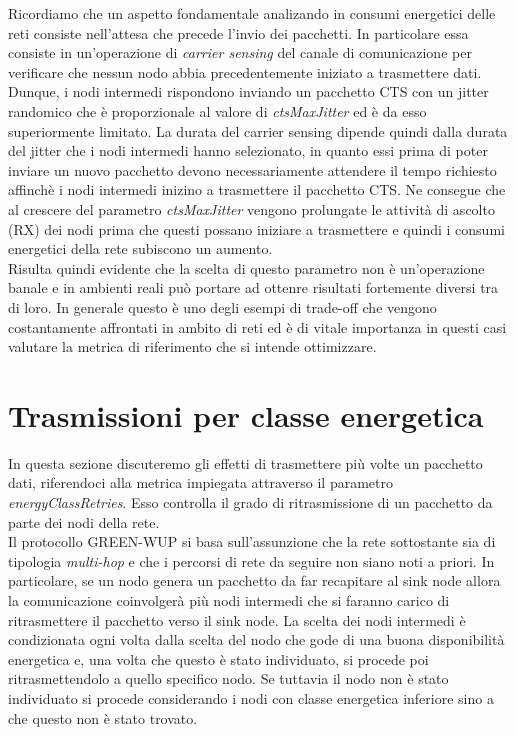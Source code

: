 \documentclass[binding=0.6cm,TFA]{sapthesis}
\begin{document}
Ricordiamo che un aspetto fondamentale analizando in consumi energetici delle reti consiste nell'attesa che precede l'invio dei pacchetti. In particolare essa
consiste in un'operazione di \emph{carrier sensing} del canale di comunicazione per verificare che nessun nodo abbia precedentemente iniziato a trasmettere dati.
Dunque, i nodi intermedi rispondono inviando un pacchetto CTS con un jitter randomico che è proporzionale al valore di \emph{ctsMaxJitter} ed è da esso superiormente
limitato. La durata del carrier sensing dipende quindi dalla durata del jitter che i nodi intermedi hanno selezionato, in quanto essi prima di poter inviare un nuovo
pacchetto devono necessariamente attendere il tempo richiesto affinchè i nodi intermedi inizino a trasmettere il pacchetto CTS. Ne consegue che al crescere del
parametro \emph{ctsMaxJitter} vengono prolungate le attività di ascolto (RX) dei nodi prima che questi possano iniziare a trasmettere e quindi i consumi energetici
della rete subiscono un aumento.\\

\newpage
Risulta quindi evidente che la scelta di questo parametro non è un'operazione banale e in ambienti reali può portare ad ottenre risultati fortemente diversi tra di loro.
In generale questo è uno degli esempi di trade-off che vengono costantamente affrontati in ambito di reti ed è di vitale importanza in questi casi valutare
la metrica di riferimento che si intende ottimizzare.

\section{Trasmissioni per classe energetica}

In questa sezione discuteremo gli effetti di trasmettere più volte un pacchetto dati, riferendoci alla metrica impiegata attraverso il parametro
\emph{energyClassRetries}. Esso controlla il grado di ritrasmissione di un pacchetto da parte dei nodi della rete.\\

Il protocollo GREEN-WUP si basa sull'assunzione che la rete sottostante sia di tipologia \emph{multi-hop} e che i percorsi di rete da seguire non siano noti a priori.
In particolare, se un nodo genera un pacchetto da far recapitare al sink node allora la comunicazione coinvolgerà più nodi intermedi che si faranno
carico di ritrasmettere il pacchetto verso il sink node. La scelta dei nodi intermedi è condizionata ogni volta dalla scelta del nodo che gode
di una buona disponibilità energetica e, una volta che questo è stato individuato, si procede poi ritrasmettendolo a quello specifico nodo. Se tuttavia
il nodo non è stato individuato si procede considerando i nodi con classe energetica inferiore sino a che questo non è stato trovato. \\
\end{document}
